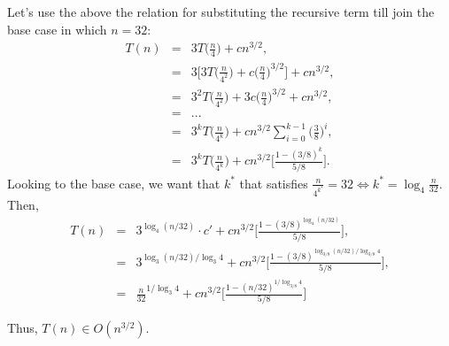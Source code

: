 \documentclass{article}
\begin{document}
	\noindent Let's use the above the relation for substituting the recursive term till join the base case in which $n=32$:
	\begin{eqnarray}
	\nonumber
	T(n) &=& 3T\Big(\frac{n}{4}\Big) + cn^{3/2}, \\
	\nonumber
	&=& 3\Bigg[ 3T\Big(\frac{n}{4^2}\Big) + c\Big(\frac{n}{4}\Big)^{3/2} \Bigg] + cn^{3/2},  \\
	\nonumber
	&=& 3^2 T\Big(\frac{n}{4^2}\Big) +3c\Big( \frac{n}{4} \Big)^{3/2} + cn^{3/2}, \\
	\nonumber
	&=& ... \\
	\nonumber
	&=& 3^{k} T\Big(\frac{n}{4^k}\Big) + cn^{3/2} \sum_{i=0}^{k-1} \Big(\frac{3}{8}\Big)^i  , \\
	\nonumber
	&=& 3^{k} T\Big(\frac{n}{4^k}\Big) + cn^{3/2}\Bigg[\frac{1-(3/8)^k}{5/8} \Bigg] .
	\end{eqnarray}
	Looking to the base case, we want that $k^*$ that satisfies $\frac{n}{4^{k^*}} = 32 \Leftrightarrow k^* = \log_4 \frac{n}{32}$.	\\
	Then, 
	\begin{eqnarray}
	\nonumber
	T(n) &=& 3^{\log_4 (n/32) } \cdot c' + cn^{3/2} \Bigg[\frac{1-(3/8)^{\log_4 (n/32)}}{5/8}\Bigg], \\
	\nonumber
	&=& 3^{\log_3 (n/32) / \log_3 4} + cn^{3/2} \Bigg[\frac{1-(3/8)^{\log_{3/8} (n/32) / \log_{3/8} 4}}{5/8}\Bigg], \\
	\nonumber
	&=&  \frac{n}{32}^{1/\log_3 4} + cn^{3/2}\Bigg[ \frac{1-(n/32)^{1 / \log_{3/8} 4}}{5/8}\Bigg]
	\end{eqnarray}
	
	Thus, $ T(n) \in O(n^{3/2}) $. 
	
\end{document}
